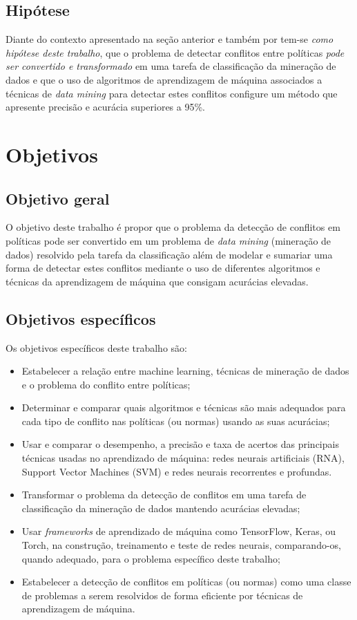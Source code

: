 \subsection{Hipótese}\label{hipótese}
Diante do contexto apresentado na seção anterior e também por \cite{fugini_information_2004} tem-se \textit{como hipótese deste trabalho}, que o problema de detectar conflitos entre políticas\textit{ pode ser convertido e transformado} em uma tarefa de classificação da mineração de dados e que o uso de algoritmos de aprendizagem de máquina associados a técnicas de \textit{data mining} para detectar estes conflitos configure um método que apresente precisão e acurácia superiores a 95\%.

\section{Objetivos}\label{objetivos}
\subsection{Objetivo geral}\label{objetivo_geral}
O objetivo deste trabalho é propor que o problema da detecção de conflitos em políticas pode ser convertido em um problema de \textit{data mining} (mineração de dados) resolvido pela tarefa da classificação além de modelar e sumariar uma forma de detectar estes conflitos mediante o uso de diferentes algoritmos e técnicas da aprendizagem de máquina que consigam acurácias elevadas.
\subsection{Objetivos específicos}
Os objetivos específicos deste trabalho são:
\begin{itemize}	
	\item Estabelecer a relação entre machine learning, técnicas de mineração de dados e o problema do conflito entre políticas;
	\item Determinar e comparar quais algoritmos e técnicas são mais adequados para cada tipo de conflito nas políticas (ou normas) usando as suas acurácias;
	\item Usar e comparar o desempenho, a precisão e taxa de acertos das principais técnicas usadas no aprendizado de máquina: redes neurais artificiais (RNA), Support Vector Machines (SVM) e redes neurais recorrentes e profundas.
	\item Transformar o problema da detecção de conflitos em uma tarefa de classificação da mineração de dados mantendo acurácias elevadas;
	\item Usar \textit{frameworks} de aprendizado de máquina como TensorFlow, Keras, ou Torch, na construção, treinamento e teste de redes neurais, comparando-os, quando adequado, para o problema específico deste trabalho;
	\item Estabelecer a detecção de conflitos em políticas (ou normas) como uma  classe de problemas a serem resolvidos de forma eficiente por técnicas de aprendizagem de máquina.
\end{itemize}


